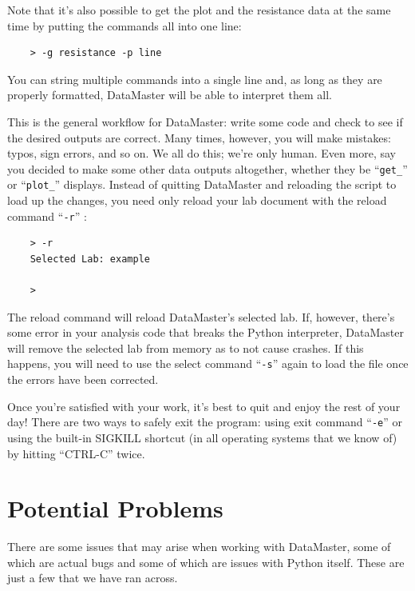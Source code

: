 \documentclass[12pt]{article}
\begin{document}
{Note that it's also possible to get the plot and the resistance data at the same time by putting the commands all into one line:
\begin{framed}
  \begin{lstlisting}
    > -g resistance -p line
  \end{lstlisting}
\end{framed}
You can string multiple commands into a single line and, as long as they are properly formatted, DataMaster will be able to interpret them all.

This is the general workflow for DataMaster: write some code and check to see if the desired outputs are correct. Many times, however, you will make mistakes: typos, sign errors, and so on. We all do this; we're only human. Even more, say you decided to make some other data outputs altogether, whether they be ``\texttt{get\_}'' or ``\texttt{plot\_}'' displays. Instead of quitting DataMaster and reloading the script to load up the changes, you need only reload your lab document with the reload command ``\texttt{-r}'' : 
\begin{framed}
  \begin{lstlisting}
    > -r
    Selected Lab: example

    > 
  \end{lstlisting}
\end{framed}
The reload command will reload DataMaster's selected lab. If, however, there's some error in your analysis code that breaks the Python interpreter, DataMaster will remove the selected lab from memory as to not cause crashes. If this happens, you will need to use the select command ``\texttt{-s}'' again to load the file once the errors have been corrected.

Once you're satisfied with your work, it's best to quit and enjoy the rest of your day! There are two ways to safely exit the program: using exit command ``\texttt{-e}'' or using the built-in SIGKILL shortcut (in all operating systems that we know of) by hitting ``CTRL-C'' twice.

\section*{Potential Problems}
\label{sec:potprob}

There are some issues that may arise when working with DataMaster, some of which are actual bugs and some of which are issues with Python itself. These are just a few that we have ran across.

}
\end{document}
